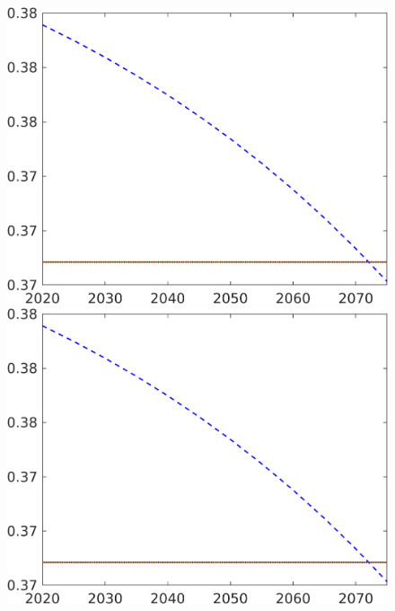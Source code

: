 \begin{figure}[h!!]
\begin{minipage}[]{0.32\textwidth}
	\end{minipage}
	\begin{minipage}[]{0.32\textwidth}
		\includegraphics[width=1\textwidth]{../../codding_model/own_basedOnFried/optimalPol_elastS_DisuSci/figures/all_1705/hh_CompEffOPT_NOT_NoTaus_spillover0_noskill1_sep1_BN0_ineq0_red0_etaa0.79_lgd0.png}
	\end{minipage}
	\begin{minipage}[]{0.32\textwidth}
		\includegraphics[width=1\textwidth]{../../codding_model/own_basedOnFried/optimalPol_elastS_DisuSci/figures/all_1705/hl_CompEffOPT_NOT_NoTaus_spillover0_noskill1_sep1_BN0_ineq0_red0_etaa0.79_lgd0.png}

\end{minipage}
\end{figure}
